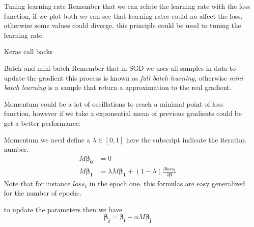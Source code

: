 \documentclass{beamer}
\begin{document}
\begin{frame}{Tuning learning rate}
Remember that we can relate the learning rate with the loss function, if we plot both we can see that learning rates could no affect the loss, otherwise some values could diverge, this principle could be used to tuning the learning rate.
\end{frame}



\begin{frame}{Keras call backs}


\end{frame}




\begin{frame}{Batch and mini batch}
Remember that in SGD we uses all samples in data to update the gradient this process is known as \emph{full batch learning}, otherwise \emph{mini batch learning} is a sample that return a approximation to the real  gradient.


\end{frame}


\begin{frame}{Momentum}
could be a lot of oscillations to reach a minimal point of loss function, however if we take a exponential mean of previous gradients could be get a better performance:


\end{frame}

\begin{frame}{Momentum}
we need define a $\lambda \in [0,1]$  here the subscript indicate the iteration number.
\begin{equation}
\begin{align*}
M\bm{\beta_{0}} &= 0 \\
M\bm{\beta_{1}} &= \lambda M\bm{\beta_{1}} + (1 - \lambda) \frac{\partial loss_{1}}{\partial \bm{\beta}}
\end{align*}
\end{equation}
Note that for instance $loss_{1}$ in the epoch one.
this formulas are easy generalized for the number of epochs.

to update the parameters then we have
\begin{equation}
\bm{\beta_{j}} = \bm{\beta_{i}} - \alpha M \bm{\beta_{j}}
\end{equation}


\end{frame}
\end{document}
